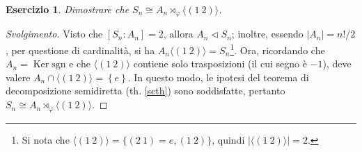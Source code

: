 \documentclass[12pt]{scrartcl}
\theoremstyle{style}
\newtheorem{esercizio}{Esercizio}[section]
\newenvironment{svolgimento}{\renewcommand\qedsymbol{$\blacksquare$}\begin{proof}[Svolgimento]}{\end{proof}}
\numberwithin{equation}{subsection}
\begin{document}
\begin{esercizio}
Dimostrare che $S_n \cong A_n \rtimes _\varphi \langle (1 \ 2) \rangle$.
\end{esercizio}
\begin{svolgimento}
	Visto che $[S_n : A_n] = 2$, allora $A_n \lhd S_n$; inoltre, essendo $\lvert A_n \rvert = n! / 2$, per questione di cardinalit\`a, si ha $A_n \langle (1 \ 2) \rangle = S_n$\footnote{Si nota che $\langle (1 \ 2) \rangle=\big\{ (2\ 1) = e , (1\ 2) \big\} $, quindi $\lvert \langle (1\ 2) \rangle \rvert =2$.}.
	Ora, ricordando che $A_ n = \operatorname{Ker} \mathrm{sgn} $ e che $\langle (1\ 2) \rangle$ contiene solo trasposizioni (il cui segno \`e $-1$), deve valere $A_n \cap \langle (1\ 2) \rangle = \left\{ e \right\} $.
	In questo modo, le ipotesi del teorema di decomposizione semidiretta (th. \ref{scth}) sono soddisfatte, pertanto $S_n \cong A_n \rtimes _\varphi \langle (1 \ 2) \rangle$.
\end{svolgimento}
\end{document}
